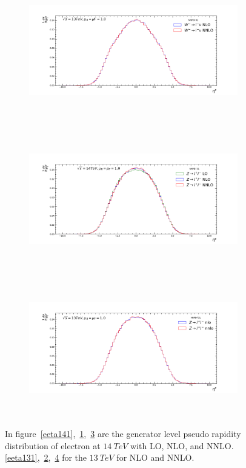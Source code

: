 \begin{figure}[H]
\begin{subfigure}{0.49\textwidth}
\caption{}
\label{eeta142}
\end{subfigure}
\begin{subfigure}{0.49\textwidth}
\includegraphics[height=6cm, width=\textwidth]{chapter4/Ewmeta_rf1_13.pdf}
\vspace*{-8mm}
\caption{}
\label{eeta132}
\end{subfigure}
\begin{subfigure}{0.49\textwidth}
\includegraphics[height=6cm, width=\textwidth]{chapter4/Ezeta_rf1_14.pdf}
\vspace*{-8mm}
\caption{}
\label{eeta143}
\end{subfigure}
\begin{subfigure}{0.49\textwidth}
\includegraphics[height=6cm, width=\textwidth]{chapter4/Ezeta_rf1_13.pdf}
\vspace*{-8mm}
\caption{}
\label{eeta133}
\end{subfigure}
\caption{In figure~\ref{eeta141},~\ref{eeta142},~\ref{eeta143} are the generator level pseudo rapidity distribution of electron at $14~TeV$ with LO, NLO, and NNLO.\ref{eeta131},~\ref{eeta132},~\ref{eeta133} for the $13~TeV$ for NLO and NNLO.}  
\label{elec1}
\end{figure}






